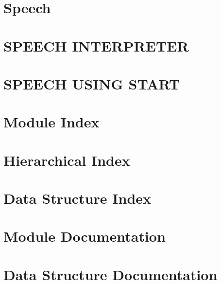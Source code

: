 \documentclass[twoside]{book}
\newcommand{\+}{\discretionary{\mbox{\scriptsize$\hookleftarrow$}}{}{}}
\newcommand{\clearemptydoublepage}{%
  \newpage{\pagestyle{empty}\cleardoublepage}%
}
\begin{document}
\chapter{Speech}
\label{md__home_runner_work_speech_speech_gh-pages_svox-speech_README}

\chapter{S\+P\+E\+E\+CH I\+N\+T\+E\+R\+P\+R\+E\+T\+ER}
\label{md__home_runner_work_speech_speech_gh-pages_speech-interpreters_README}

\chapter{S\+P\+E\+E\+CH U\+S\+I\+NG S\+T\+A\+RT}
\label{md__home_runner_work_speech_speech_gh-pages_speech-interpreters_start_README}

\chapter{Module Index}

\chapter{Hierarchical Index}

\chapter{Data Structure Index}

\chapter{Module Documentation}




\chapter{Data Structure Documentation}


\backmatter
\newpage
{}
\clearemptydoublepage
{}
\printindex
\end{document}
